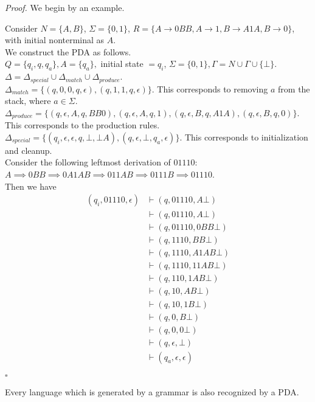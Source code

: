 \documentclass[a4paper]{article}
\newenvironment{proof}{\begin{breakbox}\textit{Proof.}}{\hfill$\square$\end{breakbox}}
\newcommand{\nl}{\vspace{0.2cm}\\}
\newcommand{\produces}{\implies}
\newcommand{\changesto}{\vdash}
\begin{document}
\begin{proof}
    We begin by an example.\nl

    \begin{eg}
        Consider $N = \{A, B\}$, $\Sigma = \{0, 1\}$, $R = \{A \to 0BB, A \to 1, B \to A1A, B \to 0\}$, with initial nonterminal as $A$.\nl
        
        We construct the PDA as follows.\nl
        
        $Q = \{q_i, q, q_a\}, A = \{q_a\},$ initial state $= q_i$, $\Sigma = \{0, 1\}, \Gamma = N \cup \Gamma \cup \{\bot\}$.\nl

        $\Delta = \Delta_{special} \cup \Delta_{match} \cup \Delta_{produce}$.\nl

        $\Delta_{match} = \{(q, 0, 0, q, \epsilon), (q, 1, 1, q, \epsilon)\}$. This corresponds to removing $a$ from the stack, where $a \in \Sigma$.\nl

        $\Delta_{produce} = \{(q, \epsilon, A, q, BB0), (q, \epsilon, A, q, 1), (q, \epsilon, B, q, A1A), (q, \epsilon, B, q, 0)\}$. This corresponds to the production rules.\nl

        $\Delta_{special} = \{(q_i, \epsilon, \epsilon, q, \bot, \bot A), (q, \epsilon, \bot, q_a, \epsilon)\}$. This corresponds to initialization and cleanup.\nl

        Consider the following leftmost derivation of $01110$: $A \produces 0BB \produces 0A1AB \produces 011AB \produces 0111B \produces 01110$.\nl

        Then we have
        \begin{align*}
            (q_i, 01110, \epsilon) &\changesto (q, 01110, A\bot)\\
                            &\changesto (q, 01110, A\bot)\\
                            &\changesto (q, 01110, 0BB\bot)\\
                            &\changesto (q, 1110, BB\bot)\\
                            &\changesto (q, 1110, A1AB\bot)\\
                            &\changesto (q, 1110, 11AB\bot)\\
                            &\changesto (q, 110, 1AB\bot)\\
                            &\changesto (q, 10, AB\bot)\\
                            &\changesto (q, 10, 1B\bot)\\
                            &\changesto (q, 0, B\bot)\\
                            &\changesto (q, 0, 0\bot)\\
                            &\changesto (q, \epsilon, \bot)\\
                            &\changesto (q_a, \epsilon, \epsilon)
        \end{align*}

    \end{eg}
\end{proof}

\begin{cor}
    Every language which is generated by a grammar is also recognized by a PDA.
\end{cor}
\end{document}
